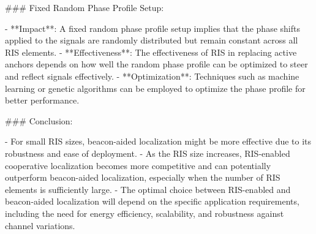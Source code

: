 ### Fixed Random Phase Profile Setup:

- **Impact**: A fixed random phase profile setup implies that the phase shifts applied to the signals are randomly distributed but remain constant across all RIS elements.
- **Effectiveness**: The effectiveness of RIS in replacing active anchors depends on how well the random phase profile can be optimized to steer and reflect signals effectively.
- **Optimization**: Techniques such as machine learning or genetic algorithms can be employed to optimize the phase profile for better performance.

### Conclusion:

- For small RIS sizes, beacon-aided localization might be more effective due to its robustness and ease of deployment.
- As the RIS size increases, RIS-enabled cooperative localization becomes more competitive and can potentially outperform beacon-aided localization, especially when the number of RIS elements is sufficiently large.
- The optimal choice between RIS-enabled and beacon-aided localization will depend on the specific application requirements, including the need for energy efficiency, scalability, and robustness against channel variations.